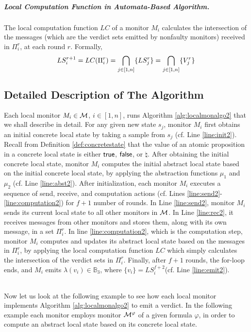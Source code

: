 \subparagraph{Local Computation Function in Automata-Based Algorithm.}The 
local computation function $LC$ of a monitor $M_i$ calculates the intersection 
of the messages (which are the verdict sets emitted by nonfaulty monitors) 
received in $\Pi_i^r$, at each round $r$. Formally,
$$LS_i^{r+1} = LC(\Pi_i^r) = \bigcap_{j \in [1, n]} \{ LS_j^r\} = 
\bigcap_{j \in [1, n]} \{V_j^r\}$$

\subsection{Detailed Description of The Algorithm}

Each local monitor $M_i \in \mathcal{M}$, $i \in [1, n]$, runs Algorithm 
\ref{alg:localmonalgo2} that we shall describe in detail. For any given new 
state $s_j$, monitor $M_i$ first obtains an initial concrete local state by 
taking a sample from $s_j$ (cf. Line \ref{line:init2}). Recall 
from Definition \ref{def:concretestate} that the value of an atomic proposition 
in a concrete local state is either $\mathsf{true}$, $\mathsf{false}$, or $\natural$. After 
obtaining the initial concrete local state, monitor $M_i$ computes the initial 
abstract local state based on the initial concrete local state, by applying the 
abstraction functions $\mu_1$ and $\mu_2$ (cf. Line 
\ref{line:abst2}). After initialization, each 
monitor $M_i$ executes a sequence of send, receive, and computation actions (cf. 
Lines \ref{line:send2}-\ref{line:computation2}) for $f +1$ number of rounds.  In 
Line \ref{line:send2}, monitor $M_i$ sends its current local state to all other 
monitors in $\mathcal{M}$. In Line \ref{line:rec2}, it receives messages from other 
monitors and stores them, along with its own message, in a set $\Pi_i^r$. In 
line \ref{line:computation2}, which is the computation step, monitor $M_i$ 
computes and updates its abstract local state based on the messages in 
$\Pi_i^r$, by applying the local computation function $LC$ which simply 
calculates the intersection of the verdict sets in  $\Pi_i^r$. Finally, after 
$f+1$ rounds, the for-loop ends, and $M_i$ emits $\lambda(v_i) \in 
\mathbb{B}_3$, where $\{v_i\} = LS_i^{f+2}$(cf. Line \ref{line:emit2}). \\

 \ \ \ \

Now let us look at the following example to see how each local monitor 
implements Algorithm \ref{alg:localmonalgo2} to emit a verdict. In the following 
example each monitor employs \LTLtri monitor $\mathcal{M}^\varphi$ of a given \LTL 
formula $\varphi$, in order to compute an abstract local state based on its 
concrete local state. 

